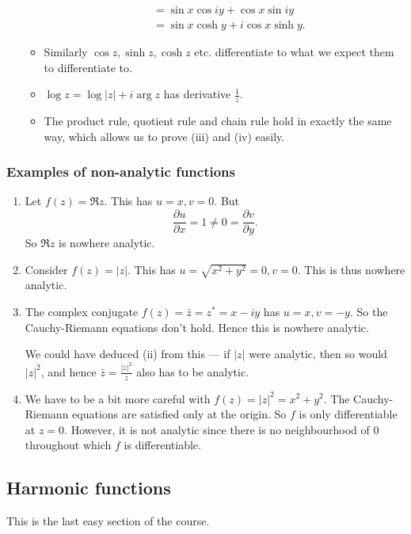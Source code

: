 \documentclass[a4paper]{article}
\begin{document}
\begin{eg}
\begin{enumerate}
\begin{itemize}
\begin{align*}
            &= \sin x \cos iy + \cos x \sin iy \\
            &= \sin x \cosh y + i \cos x \sinh y.
          \end{align*}
        \item Similarly $\cos z, \sinh z, \cosh z$ etc. differentiate to what we expect them to differentiate to.
        \item $\log z = \log|z| + i \arg z$ has derivative $\frac{1}{z}$.
        \item The product rule, quotient rule and chain rule hold in exactly the same way, which allows us to prove (iii) and (iv) easily.
      \end{itemize}
  \end{enumerate}
\end{eg}

\subsubsection*{Examples of non-analytic functions}
\begin{eg}\leavevmode
  \begin{enumerate}
    \item Let $f(z) = \Re z$. This has $u = x, v = 0$. But
      \[
        \frac{\partial u}{\partial x} = 1\not= 0 = \frac{\partial v}{\partial y}.
      \]
      So $\Re z$ is nowhere analytic.
    \item Consider $f(z) = |z|$. This has $u = \sqrt{x^2 + y^2} = 0, v = 0$. This is thus nowhere analytic.
    \item The complex conjugate $f(z) = \bar z = z^* = x - iy$ has $u = x, v = -y$. So the Cauchy-Riemann equations don't hold. Hence this is nowhere analytic.

      We could have deduced (ii) from this --- if $|z|$ were analytic, then so would $|z|^2$, and hence $\bar{z} = \frac{|z|^2}{z}$ also has to be analytic.
    \item We have to be a bit more careful with $f(z) = |z|^2 = x^2 + y^2$. The Cauchy-Riemann equations are satisfied only at the origin. So $f$ is only differentiable at $z = 0$. However, it is not analytic since there is no neighbourhood of $0$ throughout which $f$ is differentiable.
  \end{enumerate}
\end{eg}

\subsection{Harmonic functions}
This is the last easy section of the course.
\end{document}
